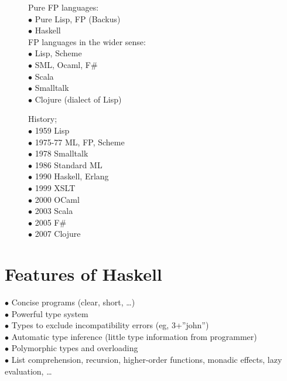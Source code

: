\documentclass[tikz,border=10pt]{project_plan}
\newcommand{\bulletPoint}{\hspace{-3.1pt}$\bullet$ \hspace{5pt}}
\begin{document}
\begin{figure}[H]
  \begin{minipage}{.5\textwidth}

    Pure FP languages:\\
    \bulletPoint Pure Lisp, FP (Backus)\\
    \bulletPoint Haskell\\

    FP languages in the wider sense:\\
    \bulletPoint Lisp, Scheme\\
    \bulletPoint SML, Ocaml, F\#\\
    \bulletPoint Scala\\
    \bulletPoint Smalltalk\\
    \bulletPoint Clojure (dialect of Lisp)

  \end{minipage}
  \begin{minipage}{.5\textwidth}
    History;\\
    \bulletPoint 1959 Lisp\\
    \bulletPoint 1975-77 ML, FP, Scheme\\
    \bulletPoint 1978 Smalltalk\\
    \bulletPoint 1986 Standard ML\\
    \bulletPoint 1990 Haskell, Erlang\\
    \bulletPoint 1999 XSLT\\
    \bulletPoint 2000 OCaml\\
    \bulletPoint 2003 Scala\\
    \bulletPoint 2005 F\#\\
    \bulletPoint 2007 Clojure

  \end{minipage}
\end{figure}

\section{Features of Haskell}

\bulletPoint Concise programs (clear, short, …)\\
\bulletPoint Powerful type system\\
\bulletPoint Types to exclude incompatibility errors (eg, 3+”john”)\\
\bulletPoint Automatic type inference (little type information from programmer)\\
\bulletPoint Polymorphic types and overloading\\
\bulletPoint List comprehension, recursion, higher-order functions, monadic effects, lazy evaluation, …
\end{document}
